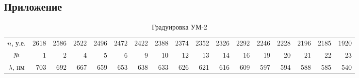 \phantom{42}
\newpage

\subsection*{Приложение}



\begin{table}[ht]
    \caption{Градуировка УМ-2}
    \centering
\begin{tabular}{crrrrrrrrrrrrrrrr}
\toprule
 $n$, у.е.        &  2618 &  2586 &  2522 &  2496 &  2472 &  2422 &  2388 &  2374 &  2352 &  2326 &  2292 &  2246 &  2228 &  2196 &  2185 &  1920 \\
№      &     1 &     2 &     4 &     5 &     6 &     9 &    10 &    12 &    13 &    14 &    16 &    19 &    20 &    21 &    22 &    23 \\
$\lambda$, нм &   703 &   692 &   667 &   659 &   653 &   638 &   633 &   626 &   621 &   616 &   609 &   597 &   594 &   588 &   585 &   540 \\
\bottomrule
\end{tabular}
\label{grad_tab}
\end{table}



